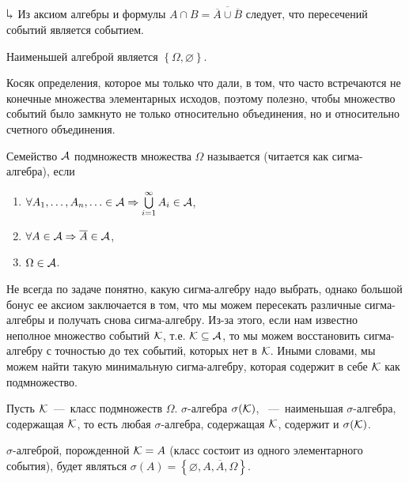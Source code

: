 \documentclass[../TV&MS.tex]{subfiles}
\begin{document}
$\h$ Из аксиом алгебры и формулы $A\cap B = \overline{\overline{A} \cup \overline {B}}$ 
следует, что пересечений событий является событием.

\begin{Ex}
	Наименьшей алгеброй является $\left\{ \Omega, \varnothing \right\}$.
\end{Ex}

Косяк определения, которое мы только что дали, в том, что часто встречаются не 
конечные множества элементарных исходов, поэтому полезно, чтобы множество
событий было замкнуто не только относительно объединения, но и 
относительно счетного объединения.

\begin{Def}
	Семейство $\mathcal{A}$ подмножеств множества $\Omega$ называется 
	(читается как сигма-алгебра), если 
\begin{enumerate}[label=(\roman*)]
	\item $\forall A_1,\dots,A_n,\ldots\in\mathcal{A}\Rightarrow\bigcup\limits_{i=1}^{\infty}A_i\in\mathcal{A}$,
	\item $\forall A \in \mathcal{A} \Rightarrow \overline{A} \in \mathcal{A}$,
	\item $\Omega \in \mathcal{A}$.
\end{enumerate}\smallskip
\end{Def}

Не всегда по задаче понятно, какую сигма-алгебру надо выбрать, однако большой
бонус ее аксиом заключается в том, что мы можем пересекать различные сигма-алгебры
и получать снова сигма-алгебру. Из-за этого, если нам известно неполное множество
событий $\mathcal{K}$, т.е. $\mathcal{K}\subseteq\mathcal{A}$, то мы можем восстановить сигма-алгебру
с точностью до тех событий, которых нет в $\mathcal{K}$. Иными словами, мы можем
найти такую минимальную сигма-алгебру, которая содержит в себе $\mathcal{K}$ как подмножество.

\begin{Def}
	Пусть $\mathcal{K}$~---~класс подмножеств $\Omega$. $\sigma$-алгебра $\sigma(\mathcal{K})$,
	~---~наименьшая $\sigma$-алгебра, содержащая $\mathcal{K}$, 
	то есть любая $\sigma$-алгебра, содержащая $\mathcal{K}$, содержит и $\sigma(\mathcal{K})$.
\end{Def}

\begin{Ex}
    $\sigma$-алгеброй, порожденной $\mathcal{K} = A$ (класс состоит из одного элементарного события), будет являться 
	$\sigma(A) = \left\{ \varnothing, A, \overline{A}, \Omega \right\}$.
\end{Ex}
\end{document}
